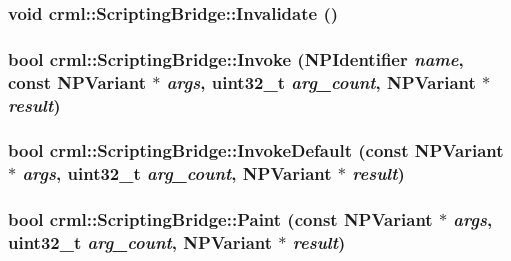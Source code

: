 \label{classcrml_1_1_scripting_bridge_a578877afcfdf32ca1330732bbf6739ad}
\hypertarget{classcrml_1_1_scripting_bridge_ad03efd11014ce3a9aeb0909d9d315f86}{
\subsubsection[{Invalidate}]{\setlength{\rightskip}{0pt plus 5cm}void crml::ScriptingBridge::Invalidate ()}}
\label{classcrml_1_1_scripting_bridge_ad03efd11014ce3a9aeb0909d9d315f86}
\hypertarget{classcrml_1_1_scripting_bridge_ac76ef418e8199808e99a562f678d670c}{
\subsubsection[{Invoke}]{\setlength{\rightskip}{0pt plus 5cm}bool crml::ScriptingBridge::Invoke ({\bf NPIdentifier} {\em name}, \/  const {\bf NPVariant} $\ast$ {\em args}, \/  uint32\_\-t {\em arg\_\-count}, \/  {\bf NPVariant} $\ast$ {\em result})}}
\label{classcrml_1_1_scripting_bridge_ac76ef418e8199808e99a562f678d670c}
\hypertarget{classcrml_1_1_scripting_bridge_a3e96aad4ad401ace8b78213f68faf29b}{
\subsubsection[{InvokeDefault}]{\setlength{\rightskip}{0pt plus 5cm}bool crml::ScriptingBridge::InvokeDefault (const {\bf NPVariant} $\ast$ {\em args}, \/  uint32\_\-t {\em arg\_\-count}, \/  {\bf NPVariant} $\ast$ {\em result})}}
\label{classcrml_1_1_scripting_bridge_a3e96aad4ad401ace8b78213f68faf29b}
\hypertarget{classcrml_1_1_scripting_bridge_a0de2960917327478a47eee5d7f780107}{
\subsubsection[{Paint}]{\setlength{\rightskip}{0pt plus 5cm}bool crml::ScriptingBridge::Paint (const {\bf NPVariant} $\ast$ {\em args}, \/  uint32\_\-t {\em arg\_\-count}, \/  {\bf NPVariant} $\ast$ {\em result})}}

